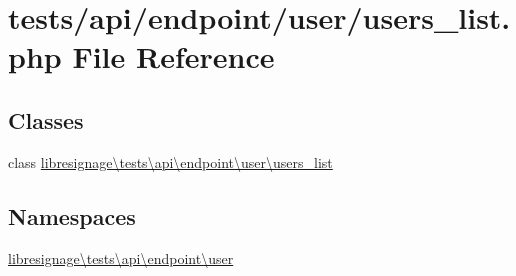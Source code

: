 \hypertarget{tests_2api_2endpoint_2user_2users__list_8php}{}\section{tests/api/endpoint/user/users\+\_\+list.php File Reference}
\label{tests_2api_2endpoint_2user_2users__list_8php}
\subsection*{Classes}
\begin{DoxyCompactItemize}
\item 
class \hyperlink{classlibresignage_1_1tests_1_1api_1_1endpoint_1_1user_1_1users__list}{libresignage\textbackslash{}tests\textbackslash{}api\textbackslash{}endpoint\textbackslash{}user\textbackslash{}users\+\_\+list}
\end{DoxyCompactItemize}
\subsection*{Namespaces}
\begin{DoxyCompactItemize}
\item 
 \hyperlink{namespacelibresignage_1_1tests_1_1api_1_1endpoint_1_1user}{libresignage\textbackslash{}tests\textbackslash{}api\textbackslash{}endpoint\textbackslash{}user}
\end{DoxyCompactItemize}
